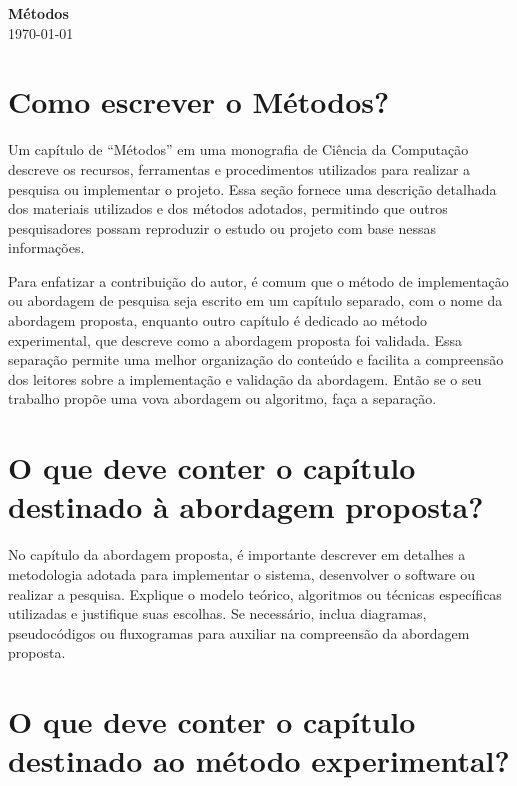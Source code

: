 \documentclass[12pt,a4paper, brazil]{article}
\begin{document}
\begin{center}
{\textbf {\huge Métodos}}\\[5mm]
\today\\[5mm] %
\end{center}



\section{Como escrever o Métodos?}

Um capítulo de ``Métodos'' em uma monografia de Ciência da Computação descreve os recursos, ferramentas e procedimentos utilizados para realizar a pesquisa ou implementar o projeto. Essa seção fornece uma descrição detalhada dos materiais utilizados e dos métodos adotados, permitindo que outros pesquisadores possam reproduzir o estudo ou projeto com base nessas informações. 


Para enfatizar a contribuição do autor, é comum que o método de implementação ou abordagem de pesquisa seja escrito em um capítulo separado, com o nome da abordagem proposta, enquanto outro capítulo é dedicado ao método experimental, que descreve como a abordagem proposta foi validada. Essa separação permite uma melhor organização do conteúdo e facilita a compreensão dos leitores sobre a implementação e validação da abordagem. Então se o seu trabalho propõe uma vova abordagem ou algoritmo, faça a separação. 

\section{O que deve conter o capítulo destinado à abordagem proposta?}

No capítulo da abordagem proposta, é importante descrever em detalhes a metodologia adotada para implementar o sistema, desenvolver o software ou realizar a pesquisa. Explique o modelo teórico, algoritmos ou técnicas específicas utilizadas e justifique suas escolhas. Se necessário, inclua diagramas, pseudocódigos ou fluxogramas para auxiliar na compreensão da abordagem proposta.

\section{O que deve conter o capítulo destinado ao método experimental?}
\end{document}
